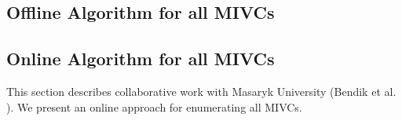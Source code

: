 \subsection{Offline Algorithm for all MIVCs}
\label{sec:offaivc}


\subsection{Online Algorithm for all MIVCs}
\label{sec:onaivc}
This section describes collaborative work with Masaryk University (Bendik et al. \cite{Jar2017}). We present an online approach for enumerating all MIVCs.

